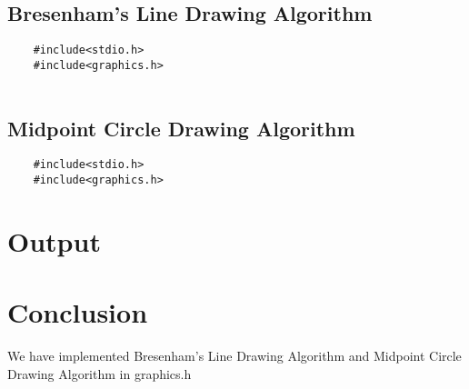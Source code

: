 \documentclass[12pt]{article}
\begin{document}
	\subsection{Bresenham's Line Drawing Algorithm}
	\begin{verbatim}
	#include<stdio.h>
	#include<graphics.h>
		
	\end{verbatim}		

	\subsection{Midpoint Circle Drawing Algorithm}
	\begin{verbatim}
	#include<stdio.h>
	#include<graphics.h>

	\end{verbatim}

	\section{Output}


	\section{Conclusion}
	We have implemented Bresenham's Line Drawing Algorithm and Midpoint Circle Drawing Algorithm in graphics.h
\end{document}
